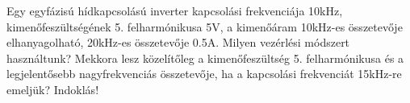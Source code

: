 \begin{example}

Egy egyfázisú hídkapcsolású inverter kapcsolási frekvenciája 10kHz, kimenőfeszültségének 5. felharmónikusa 5V, a kimenőáram 10kHz-es összetevője elhanyagolható, 20kHz-es összetevője 0.5A. Milyen vezérlési módszert használtunk? Mekkora lesz közelítőleg a kimenőfeszültség 5. felharmónikusa és a legjelentősebb nagyfrekvenciás összetevője, ha a kapcsolási frekvenciát 15kHz-re emeljük? Indoklás! 

\tcbline
\vspace{1mm}

\solution

\end{example}